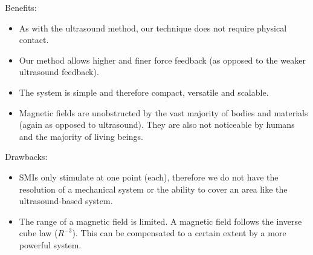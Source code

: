 \documentclass[10pt,journal,compsoc]{IEEEtran}
\begin{document}
	Benefits:
	
	\begin{itemize}
		\item As with the ultrasound method, our technique does not require physical contact.
		\item Our method allows higher and finer force feedback (as opposed to the weaker ultrasound feedback).
		\item The system is simple and therefore compact, versatile and scalable.
		\item Magnetic fields are unobstructed by the vast majority of bodies and materials (again as opposed to ultrasound). They are also not noticeable by humans and the majority of living beings.
	\end{itemize}
	
	Drawbacks:
	
	\begin{itemize}
		\item SMIs only stimulate at one point (each), therefore we do not have the resolution of a mechanical system or the ability to cover an area like the ultrasound-based system.
		\item The range of a magnetic field is limited. A magnetic field follows the inverse cube law ($ R ^ {- 3} $). This can be compensated to a certain extent by a more powerful system.
	\end{itemize}
	
\end{document}
